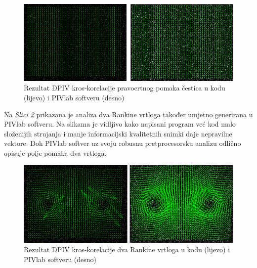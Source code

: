 \begin{figure}[h]  
	\centering
	\includegraphics[width=15.5cm]{./6_PrimjerKrosKorelacije/pravocrtnoKodlivoPIVlabdesno.pdf} 
	\caption{Rezultat DPIV kros-korelacije pravocrtnog pomaka čestica u kodu (lijevo) i PIVlab softveru (desno)}
	\label{sl:6.6}
\end{figure}
\par
Na \textit{Slici \ref{sl:6.7}} prikazana je analiza dva Rankine vrtloga \cite{wiki:Rankine} također umjetno generirana u PIVlab softveru. Na slikama je vidljivo kako napisani program već kod malo složenijih strujanja i manje informacijski kvalitetnih snimki daje nepravilne vektore. Dok PIVlab softver uz svoju robusnu pretprocesorsku analizu odlično opisuje polje pomaka dva vrtloga.
\begin{figure}[h]  
	\centering
	\includegraphics[width=15.5cm]{./6_PrimjerKrosKorelacije/vortexKodlivoPIVlabdesno.pdf} 
	\caption{Rezultat DPIV kros-korelacije dva Rankine vrtloga u kodu (lijevo) i PIVlab softveru (desno)}
	\label{sl:6.7}
\end{figure}
